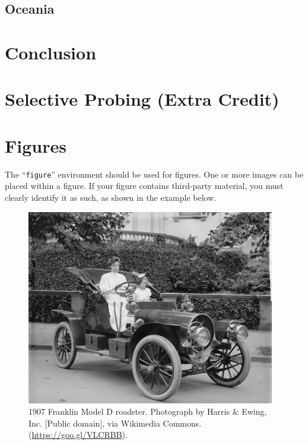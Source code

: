 \documentclass[acmsmall]{acmart}
\begin{document}
\subsection{Oceania}

\section{Conclusion}

\section{Selective Probing (Extra Credit)}



\section{Figures} 


The ``\verb|figure|'' environment should be used for figures. One or
more images can be placed within a figure. If your figure contains
third-party material, you must clearly identify it as such, as shown
in the example below.
\begin{figure}[h]
  \centering
  \includegraphics[width=\linewidth]{sample-franklin}
  \caption{1907 Franklin Model D roadster. Photograph by Harris \&
    Ewing, Inc. [Public domain], via Wikimedia
    Commons. (\url{https://goo.gl/VLCRBB}).}
\end{figure}
\end{document}
